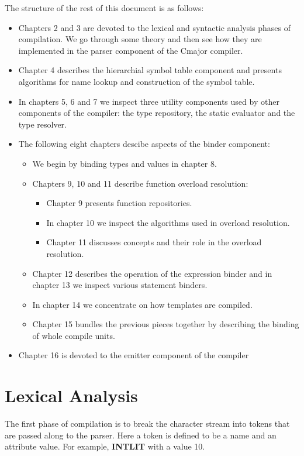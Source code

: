 \documentclass[a4paper,oneside,11pt]{book}
\theoremstyle{definition}
\begin{document}
The structure of the rest of this document is as follows:
\begin{itemize}
\item
Chapters 2 and 3 are devoted to the lexical and syntactic analysis phases of compilation.
We go through some theory and then see how they are implemented in the parser component of the Cmajor compiler.
\item
Chapter 4 describes the hierarchial symbol table component and presents algorithms for name lookup and construction of the symbol table.
\item
In chapters 5, 6 and 7 we inspect three utility components used by other components of the compiler:
the type repository, the static evaluator and the type resolver.
\item
The following eight chapters descibe aspects of the binder component:
\begin{itemize}
\item
We begin by binding types and values in chapter 8.
\item
Chapters 9, 10 and 11 describe function overload resolution:
\begin{itemize}
\item
Chapter 9 presents function repositories.
\item
In chapter 10 we inspect the algorithms used in overload resolution.
\item
Chapter 11 discusses concepts and their role in the overload resolution.
\end{itemize}
\item
Chapter 12 describes the operation of the expression binder and in chapter 13 we inspect various statement binders.
\item
In chapter 14 we concentrate on how templates are compiled.
\item
Chapter 15 bundles the previous pieces together by describing the binding of whole compile units.
\end{itemize}
\item
Chapter 16 is devoted to the emitter component of the compiler
\end{itemize}

\chapter{Lexical Analysis}

The first phase of compilation is to break the character stream into tokens that are passed along to the parser.
Here a token is defined to be a name and an attribute value.
For example, \textbf{INTLIT} with a value 10.
\end{document}
